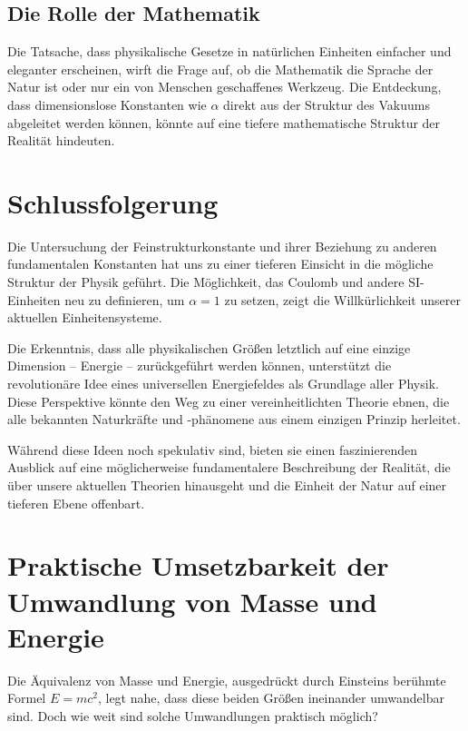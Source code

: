 \documentclass{article}
\begin{document}
\subsection{Die Rolle der Mathematik}

Die Tatsache, dass physikalische Gesetze in natürlichen Einheiten einfacher und eleganter erscheinen, wirft die Frage auf, ob die Mathematik die Sprache der Natur ist oder nur ein von Menschen geschaffenes Werkzeug. Die Entdeckung, dass dimensionslose Konstanten wie $\alpha$ direkt aus der Struktur des Vakuums abgeleitet werden können, könnte auf eine tiefere mathematische Struktur der Realität hindeuten.

\section{Schlussfolgerung}

Die Untersuchung der Feinstrukturkonstante und ihrer Beziehung zu anderen fundamentalen Konstanten hat uns zu einer tieferen Einsicht in die mögliche Struktur der Physik geführt. Die Möglichkeit, das Coulomb und andere SI-Einheiten neu zu definieren, um $\alpha = 1$ zu setzen, zeigt die Willkürlichkeit unserer aktuellen Einheitensysteme.

Die Erkenntnis, dass alle physikalischen Größen letztlich auf eine einzige Dimension – Energie – zurückgeführt werden können, unterstützt die revolutionäre Idee eines universellen Energiefeldes als Grundlage aller Physik. Diese Perspektive könnte den Weg zu einer vereinheitlichten Theorie ebnen, die alle bekannten Naturkräfte und -phänomene aus einem einzigen Prinzip herleitet.

Während diese Ideen noch spekulativ sind, bieten sie einen faszinierenden Ausblick auf eine möglicherweise fundamentalere Beschreibung der Realität, die über unsere aktuellen Theorien hinausgeht und die Einheit der Natur auf einer tieferen Ebene offenbart.
\section{Praktische Umsetzbarkeit der Umwandlung von Masse und Energie}

Die Äquivalenz von Masse und Energie, ausgedrückt durch Einsteins berühmte Formel $E = mc^2$, legt nahe, dass diese beiden Größen ineinander umwandelbar sind. Doch wie weit sind solche Umwandlungen praktisch möglich?
\end{document}
